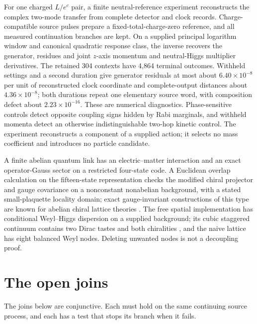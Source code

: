 \documentclass[11pt]{article}
\begin{document}
For one charged \(L/e^c\) pair, a finite neutral-reference experiment
reconstructs the complex two-mode transfer from complete detector and clock
records. Charge-compatible source pulses prepare a fixed-total-charge-zero
reference, and all measured continuation branches are kept. On a supplied
principal logarithm window and canonical quadratic response class, the
inverse recovers the generator, residues and joint \(z\)-axis momentum and
neutral-Higgs multiplier derivatives. The retained 304 contexts have 4,864
terminal outcomes. Withheld settings and a second duration give generator
residuals at most about \(6.40\times10^{-8}\) per unit of reconstructed clock
coordinate and complete-output distances about \(4.36\times10^{-8}\); both
durations repeat one elementary source word, with composition defect about
\(2.23\times10^{-16}\). These are numerical diagnostics. Phase-sensitive
controls detect opposite coupling signs hidden by Rabi marginals, and
withheld momenta detect an otherwise indistinguishable two-hop kinetic
control. The experiment reconstructs a component of a supplied action; it
selects no mass coefficient and introduces no particle candidate.

A finite abelian quantum link has an electric--matter interaction and an
exact operator-Gauss sector on a restricted four-state code. A Euclidean
overlap calculation on the fifteen-state representation checks the modified
chiral projector and gauge covariance on a nonconstant nonabelian background,
with a stated small-plaquette locality domain; exact gauge-invariant
constructions of this type are known for abelian chiral lattice theories
\cite{luscher1999,luscher2000,kadohKikukawa2008}. The free spatial
implementation has conditional Weyl--Higgs dispersion on a supplied
background; its cubic staggered continuum contains two Dirac tastes and both
chiralities \cite{Susskind1977,MisumiStaggered2026}, and the naive lattice has
eight balanced Weyl nodes. Deleting unwanted nodes is not a decoupling proof.




\section{The open joins}
\label{sec:particle-joins}

The joins below are conjunctive. Each must hold on the same continuing
source process, and each has a test that stops its branch when it fails.
\end{document}
